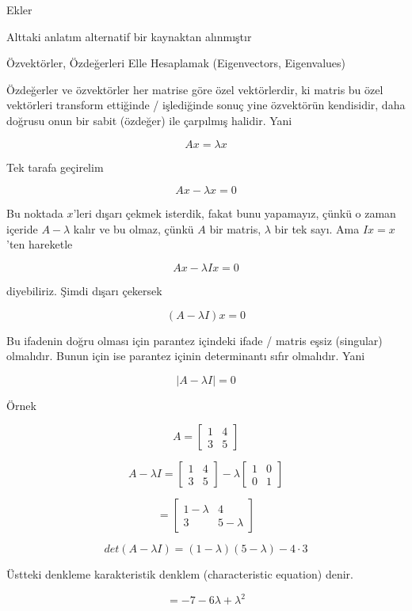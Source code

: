 \documentclass[12pt,fleqn]{article}\usepackage{../../common}
\begin{document}
Ekler 

Alttaki anlatım alternatif bir kaynaktan alınmıştır

Özvektörler, Özdeğerleri Elle Hesaplamak (Eigenvectors, Eigenvalues)

Özdeğerler ve özvektörler her matrise göre özel vektörlerdir, ki matris bu
özel vektörleri transform ettiğinde / işlediğinde sonuç yine özvektörün
kendisidir, daha doğrusu onun bir sabit (özdeğer) ile çarpılmış
halidir. Yani

$$ Ax = \lambda x $$

Tek tarafa geçirelim

$$ Ax - \lambda x = 0 $$

Bu noktada $x$'leri dışarı çekmek isterdik, fakat bunu yapamayız, çünkü o
zaman içeride $A - \lambda$ kalır ve bu olmaz, çünkü $A$ bir matris,
$\lambda$ bir tek sayı. Ama $Ix = x$'ten hareketle

$$ Ax - \lambda I x = 0 $$

diyebiliriz. Şimdi dışarı çekersek

$$ (A - \lambda I) x = 0 $$

Bu ifadenin doğru olması için parantez içindeki ifade / matris eşsiz
(singular) olmalıdır. Bunun için ise parantez içinin determinantı sıfır
olmalıdır. Yani

$$ |A - \lambda I| = 0 $$

Örnek 

$$ 
A = 
\left[\begin{array}{rr}
1 & 4 \\ 3 & 5
\end{array}\right]
$$

$$ 
A - \lambda I = 
\left[\begin{array}{rr}
1 & 4 \\ 3 & 5
\end{array}\right] - 
\lambda
\left[\begin{array}{rr}
1 & 0 \\ 0 & 1
\end{array}\right] 
$$

$$
= \left[\begin{array}{rr}
1 - \lambda & 4 \\ 3 & 5-\lambda
\end{array}\right]
$$

$$ det(A - \lambda I) = (1-\lambda)(5-\lambda) - 4 \cdot 3 $$

Üstteki denkleme karakteristik denklem (characteristic equation) denir. 

$$ = -7 -6\lambda + \lambda^2 $$
\end{document}
